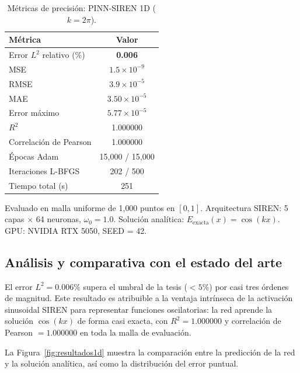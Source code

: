 \begin{table}[htbp]
\centering
\begin{threeparttable}
\caption{Métricas de precisión: PINN-SIREN 1D ($k = 2\pi$).}
\label{tab:resultados1d}
\begin{tabular}{lc}
\toprule
Métrica & Valor \\
\midrule
Error $L^2$ relativo (\%)    & \textbf{0.006} \\
MSE                          & $1.5 \times 10^{-9}$ \\
RMSE                         & $3.9 \times 10^{-5}$ \\
MAE                          & $3.50 \times 10^{-5}$ \\
Error máximo                 & $5.77 \times 10^{-5}$ \\
$R^2$                        & 1.000000 \\
Correlación de Pearson       & 1.000000 \\
\midrule
Épocas Adam                  & 15{,}000 / 15{,}000 \\
Iteraciones L-BFGS           & 202 / 500 \\
Tiempo total (s)             & 251 \\
\bottomrule
\end{tabular}
\begin{tablenotes}\small
    \item Evaluado en malla uniforme de 1{,}000 puntos en $[0,1]$.
    Arquitectura SIREN: 5 capas $\times$ 64 neuronas, $\omega_0 = 1.0$.
    Solución analítica: $E_\text{exacta}(x) = \cos(kx)$.
    GPU: NVIDIA RTX 5050, SEED = 42.
\end{tablenotes}
\end{threeparttable}
\end{table}

\subsection{Análisis y comparativa con el estado del arte}

El error $L^2 = 0.006\%$ supera el umbral de la tesis ($< 5\%$) por casi tres
órdenes de magnitud. Este resultado es atribuible a la ventaja intrínseca de
la activación sinusoidal SIREN para representar funciones oscilatorias: la
red aprende la solución $\cos(kx)$ de forma casi exacta, con
$R^2 = 1.000000$ y correlación de Pearson $= 1.000000$ en toda la malla de
evaluación.

La Figura~\ref{fig:resultados1d} muestra la comparación entre la predicción de
la red y la solución analítica, así como la distribución del error puntual.

